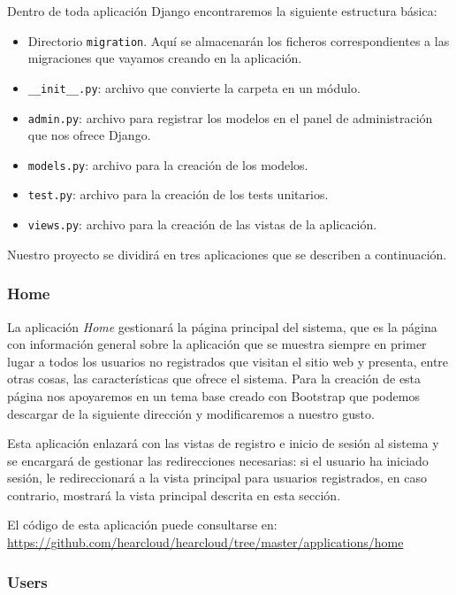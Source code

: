Dentro de toda aplicación Django encontraremos la siguiente estructura básica:

\begin{itemize}
	\item Directorio \texttt{migration}. Aquí se almacenarán los ficheros correspondientes a las migraciones que vayamos creando en la aplicación.
	\item \texttt{\_\_init\_\_.py}: archivo que convierte la carpeta en un módulo.
	\item \texttt{admin.py}: archivo para registrar los modelos en el panel de administración que nos ofrece Django.
	\item \texttt{models.py}: archivo para la creación de los modelos.
	\item \texttt{test.py}: archivo para la creación de los tests unitarios.
	\item \texttt{views.py}: archivo para la creación de las vistas de la aplicación.
\end{itemize}

Nuestro proyecto se dividirá en tres aplicaciones que se describen a continuación.

\subsubsection{Home}

La aplicación \textit{Home} gestionará la página principal del sistema, que es la página con información general sobre la aplicación que se muestra siempre en primer lugar a todos los usuarios no registrados que visitan el sitio web y presenta, entre otras cosas, las características que ofrece el sistema. Para la creación de esta página nos apoyaremos en un tema base creado con Bootstrap que podemos descargar de la siguiente dirección \cite{SBA} y modificaremos a nuestro gusto.

Esta aplicación enlazará con las vistas de registro e inicio de sesión al sistema y se encargará de gestionar las redirecciones necesarias: si el usuario ha iniciado sesión, le redireccionará a la vista principal para usuarios registrados, en caso contrario, mostrará la vista principal descrita en esta sección.

El código de esta aplicación puede consultarse en: \url{https://github.com/hearcloud/hearcloud/tree/master/applications/home}

\subsubsection{Users}

